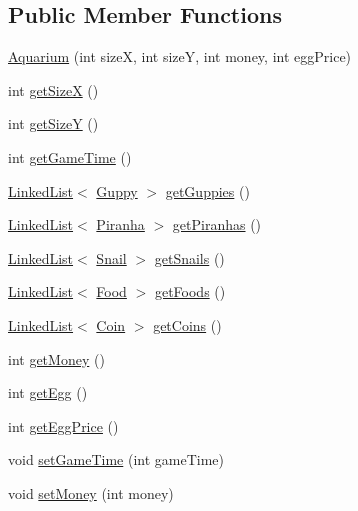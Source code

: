 \subsection*{Public Member Functions}
\begin{DoxyCompactItemize}
\item 
\mbox{\hyperlink{class_aquarium_ab99a26856347e9a9732f60cfb6a78296}{Aquarium}} (int sizeX, int sizeY, int money, int egg\+Price)
\item 
int \mbox{\hyperlink{class_aquarium_ac2e5c1499608a5d7c2f47a7ba4dee132}{get\+SizeX}} ()
\item 
int \mbox{\hyperlink{class_aquarium_ae7c79ab9763151e19723de5f29e64028}{get\+SizeY}} ()
\item 
int \mbox{\hyperlink{class_aquarium_a275fe429b5baa09995d06e02e82d068e}{get\+Game\+Time}} ()
\item 
\mbox{\hyperlink{class_linked_list}{Linked\+List}}$<$ \mbox{\hyperlink{class_guppy}{Guppy}} $>$ \mbox{\hyperlink{class_aquarium_a066f295616bf7dc88c0612c663c7ec2a}{get\+Guppies}} ()
\item 
\mbox{\hyperlink{class_linked_list}{Linked\+List}}$<$ \mbox{\hyperlink{class_piranha}{Piranha}} $>$ \mbox{\hyperlink{class_aquarium_ab45bfd1f7ccbbb8cbe497a0c30c026d3}{get\+Piranhas}} ()
\item 
\mbox{\hyperlink{class_linked_list}{Linked\+List}}$<$ \mbox{\hyperlink{class_snail}{Snail}} $>$ \mbox{\hyperlink{class_aquarium_ad892096807da645e15351c8df29d75de}{get\+Snails}} ()
\item 
\mbox{\hyperlink{class_linked_list}{Linked\+List}}$<$ \mbox{\hyperlink{class_food}{Food}} $>$ \mbox{\hyperlink{class_aquarium_ac47310f32364a37c85349445034ea802}{get\+Foods}} ()
\item 
\mbox{\hyperlink{class_linked_list}{Linked\+List}}$<$ \mbox{\hyperlink{class_coin}{Coin}} $>$ \mbox{\hyperlink{class_aquarium_a93d60eb37e0306107617dc4d97adcacc}{get\+Coins}} ()
\item 
int \mbox{\hyperlink{class_aquarium_ae7d57c7679df14fed4c89b7e5a132316}{get\+Money}} ()
\item 
int \mbox{\hyperlink{class_aquarium_a27dcfed721c8fa4deee9c168e9478b2c}{get\+Egg}} ()
\item 
int \mbox{\hyperlink{class_aquarium_ad5e2f2db9e09447fcb89ca3a558a69ce}{get\+Egg\+Price}} ()
\item 
void \mbox{\hyperlink{class_aquarium_a8717586304a44390ef1d8363ebf2d42e}{set\+Game\+Time}} (int game\+Time)
\item 
void \mbox{\hyperlink{class_aquarium_af845b924b868a8897f3d8f2a104e22f7}{set\+Money}} (int money)

\end{DoxyCompactItemize}
